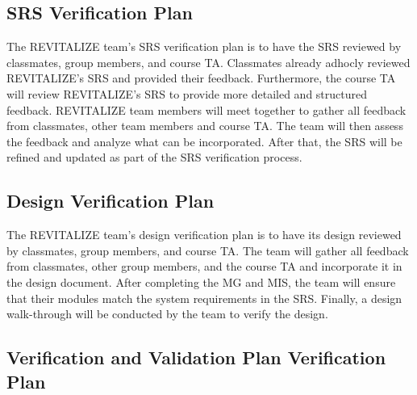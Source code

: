 \documentclass[12pt, titlepage]{article}
\begin{document}
\subsection{SRS Verification Plan}



The REVITALIZE team's SRS verification plan is to have the SRS reviewed by classmates, group members, and course TA. Classmates already adhocly reviewed REVITALIZE's SRS and provided their feedback. Furthermore, the course TA will review REVITALIZE's SRS to provide more detailed and structured feedback. REVITALIZE team members will meet together to gather all feedback from classmates, other team members and course TA. The team will then assess the feedback and analyze what can be incorporated. After that, the SRS will be refined and updated as part of the SRS verification process.

\subsection{Design Verification Plan}




The REVITALIZE team's design verification plan is to have its design reviewed by classmates, group members, and course TA. The team will gather all feedback from classmates, other group members, and the course TA and incorporate it in the design document. After completing the MG and MIS, the team will ensure that their modules match the system requirements in the SRS. Finally, a design walk-through will be conducted by the team to verify the design.

\subsection{Verification and Validation Plan Verification Plan}


\end{document}
